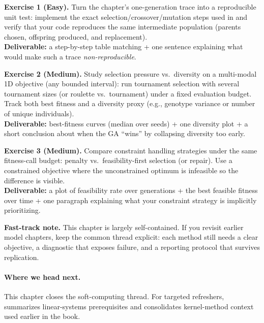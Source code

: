 \begin{tcolorbox}[summarybox, title={Exercises}]
\textbf{Exercise 1 (Easy).} Turn the chapter's one-generation trace into a reproducible unit test: implement the exact selection/crossover/mutation steps used in  and verify that your code reproduces the same intermediate population (parents chosen, offspring produced, and replacement). \\
\textbf{Deliverable:} a step-by-step table matching  + one sentence explaining what would make such a trace \emph{non-reproducible}.

\smallskip
\textbf{Exercise 2 (Medium).} Study selection pressure vs.\ diversity on a multi-modal 1D objective (any bounded interval): run tournament selection with several tournament sizes (or roulette vs.\ tournament) under a fixed evaluation budget. Track both best fitness and a diversity proxy (e.g., genotype variance or number of unique individuals). \\
\textbf{Deliverable:} best-fitness curves (median over seeds) + one diversity plot + a short conclusion about when the GA ``wins'' by collapsing diversity too early.

\smallskip
\textbf{Exercise 3 (Medium).} Compare constraint handling strategies under the same fitness-call budget: penalty vs.\ feasibility-first selection (or repair). Use a constrained objective where the unconstrained optimum is infeasible so the difference is visible. \\
\textbf{Deliverable:} a plot of feasibility rate over generations + the best feasible fitness over time + one paragraph explaining what your constraint strategy is implicitly prioritizing.

\medskip
\noindent\textbf{Fast-track note.} This chapter is largely self-contained. If you revisit earlier model chapters, keep the common thread explicit: each method still needs a clear objective, a diagnostic that exposes failure, and a reporting protocol that survives replication.
\end{tcolorbox}

\paragraph{Where we head next.} This chapter closes the soft-computing thread. For targeted refreshers,  summarizes linear-systems prerequisites and  consolidates kernel-method context used earlier in the book.

\nocite{Holland1975, Koza1992, Goldberg1989, Deb2001Book, Mitchell1998}
